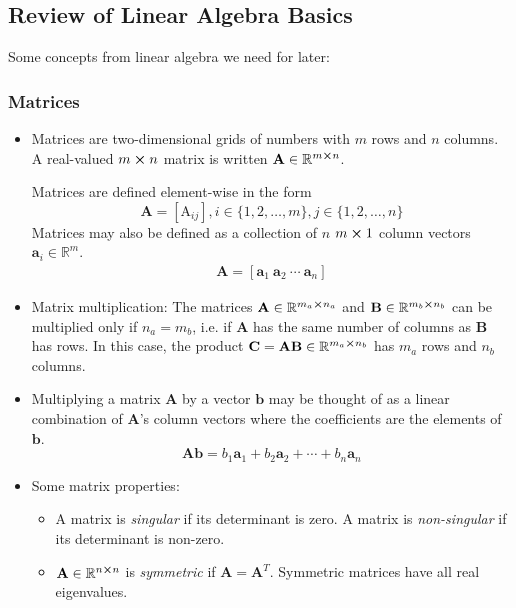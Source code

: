 \documentclass[11pt, a4paper]{article}
\newcommand{\R}{\mathbb{R}} %
\newcommand{\mat}[1]{\mathbf{#1}} %
\begin{document}
\subsection{Review of Linear Algebra Basics}
Some concepts from linear algebra we need for later:
\subsubsection{Matrices}
\begin{itemize}
	\item Matrices are two-dimensional grids of numbers with $ m $ rows and $ n $ columns. A real-valued $ m \cross n $ matrix is written $ \mat{A} \in \R^{m\cross n} $. 
	
	Matrices are defined element-wise in the form 
	\begin{equation*}
		 \mat{A} = [\mathrm{A}_{ij}],  i \in \{1, 2, \dots, m\}, j \in \{1,2, \dots, n\} 
	\end{equation*}
	Matrices may also be defined as a collection of $ n $  $ m \cross 1 $ column vectors $ \bm{a}_i \in \R^{m} $.
	\begin{align*}
		\mat{A} = [\bm{a}_1 \ \bm{a}_2 \ \cdots \ \bm{a}_n]
	\end{align*}
	
	\item Matrix multiplication: The matrices $ \mat{A} \in \R^{m_{a} \cross n_{a}}$ and $ \mathbf{B} \in \R^{m_{b} \cross n_{b}} $ can be multiplied only if $ n_{a} = m_{b} $, i.e. if $ \mat{A} $ has the same number of columns as $ \mathbf{B} $ has rows. In this case, the product $ \mat{C} = \mat{A} \mat{B} \in \R^{m_{a} \cross n_{b}} $ has $ m_{a} $ rows and $ n_{b} $ columns.
	
	\item Multiplying a matrix $ \mathbf{A} $ by a vector $ \bm{b} $ may be thought of as a linear combination of $ \mat{A} $'s column vectors where the coefficients are the elements of $ \bm{b} $.
	\begin{equation*}
		\mat{A} \bm{b} = b_1 \bm{a}_1 + b_2 \bm{a}_2 + \cdots + b_n \bm{a}_n
	\end{equation*}
	
	\item Some matrix properties:
	\begin{itemize}
		\item A matrix is \textit{singular} if its determinant is zero. A matrix is \textit{non-singular} if its determinant is non-zero.
		
		\item $ \mat{A} \in \R^{n \cross n} $ is \textit{symmetric} if $ \mat{A} = \mat{A}^{T} $. Symmetric matrices have all real eigenvalues.
		

\end{itemize}
\end{itemize}
\end{document}
